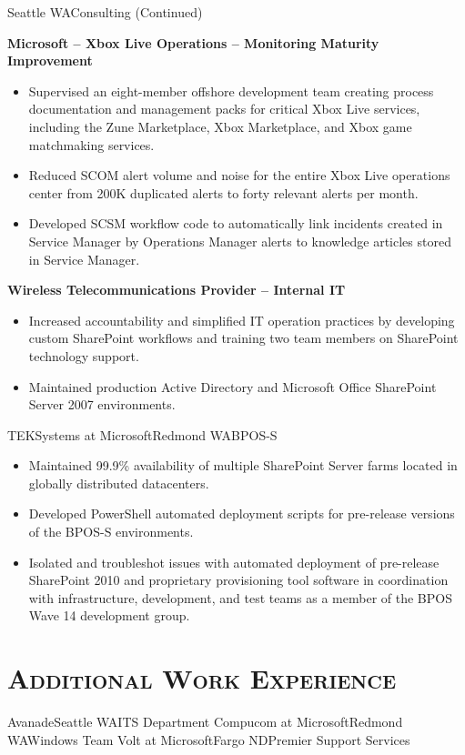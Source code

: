 \documentclass[11pt,letter,roman]{moderncv}
\begin{document}
{Seattle WA}{Consulting (Continued)}{%
  \textbf{Microsoft -- Xbox Live Operations -- Monitoring Maturity Improvement}
  \begin{itemize}
    \item Supervised an eight-member offshore development team creating
      process documentation and management packs for critical Xbox Live
      services, including the Zune Marketplace, Xbox Marketplace, and Xbox
      game matchmaking services.
    \item Reduced SCOM alert volume and noise for the entire Xbox Live
      operations center from 200K duplicated alerts to forty relevant alerts
      per month.
    \item Developed SCSM workflow code to automatically link incidents created
      in Service Manager by Operations Manager alerts to knowledge articles
      stored in Service Manager.
  \end{itemize}
  \textbf{Wireless Telecommunications Provider -- Internal IT}
  \begin{itemize}
    \item Increased accountability and simplified IT operation practices by
      developing custom SharePoint workflows and training two team members
      on SharePoint technology support.
    \item Maintained production Active Directory and Microsoft Office
      SharePoint Server 2007 environments.
  \end{itemize}
}
{TEKSystems at Microsoft}{Redmond WA}{BPOS-S}{%
  \begin{itemize}
    \item Maintained 99.9\% availability of multiple SharePoint Server farms
      located in globally distributed datacenters.
    \item Developed PowerShell automated deployment scripts for pre-release
      versions of the BPOS-S environments.
    \item Isolated and troubleshot issues with automated deployment of
      pre-release SharePoint 2010 and proprietary provisioning tool software
      in coordination with infrastructure, development, and test teams as a
      member of the BPOS Wave 14 development group.
  \end{itemize}
}

\section{\textsc{Additional Work Experience}}
{Avanade}{Seattle WA}{ITS Department}{}
{Compucom at Microsoft}{Redmond WA}{Windows Team}{}
{Volt at Microsoft}{Fargo ND}{Premier Support Services}{}
\end{document}
